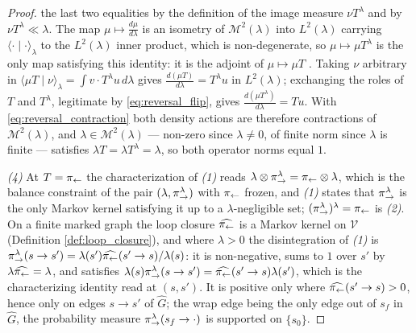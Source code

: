 \begin{proof}
the last two equalities by the definition of the image measure $\nu T^\lambda$ and by $\nu T^\lambda\ll\lambda$. The map $\mu\mapsto\frac{d\mu}{d\lambda}$ is an isometry of $\mathcal M^2(\lambda)$ into $L^2(\lambda)$ carrying $\langle\cdot\mid\cdot\rangle_\lambda$ to the $L^2(\lambda)$ inner product, which is non-degenerate, so $\mu\mapsto\mu T^\lambda$ is the only map satisfying this identity: it is the adjoint of $\mu\mapsto\mu T$ \cite{brezis2011functional}. Taking $\nu$ arbitrary in $\langle\mu T\mid\nu\rangle_\lambda=\int v\cdot T^\lambda u\,d\lambda$ gives $\frac{d(\mu T)}{d\lambda}=T^\lambda u$ in $L^2(\lambda)$; exchanging the roles of $T$ and $T^\lambda$, legitimate by \eqref{eq:reversal_flip}, gives $\frac{d(\mu T^\lambda)}{d\lambda}=Tu$. With \eqref{eq:reversal_contraction} both density actions are therefore contractions of $\mathcal M^2(\lambda)$, and $\lambda\in\mathcal M^2(\lambda)$ --- non-zero since $\lambda\neq0$, of finite norm since $\lambda$ is finite --- satisfies $\lambda T=\lambda T^\lambda=\lambda$, so both operator norms equal $1$.

\emph{(4)} At $T=\pi_{\leftarrow}$ the characterization of \emph{(1)} reads $\lambda\otimes\pi_{\rightarrow}^\lambda=\pi_{\leftarrow}\otimes\lambda$, which is the balance constraint of the pair $(\lambda,\pi_{\rightarrow}^\lambda)$ with $\pi_{\leftarrow}$ frozen, and \emph{(1)} states that $\pi_{\rightarrow}^\lambda$ is the only Markov kernel satisfying it up to a $\lambda$-negligible set; $(\pi_{\rightarrow}^\lambda)^\lambda=\pi_{\leftarrow}$ is \emph{(2)}. On a finite marked graph the loop closure $\widehat{\pi_{\leftarrow}}$ is a Markov kernel on $\mathcal V$ (Definition \ref{def:loop_closure}), and where $\lambda>0$ the disintegration of \emph{(1)} is $\pi_{\rightarrow}^\lambda(s\rightarrow s')=\lambda(s')\widehat{\pi_{\leftarrow}}(s'\rightarrow s)/\lambda(s)$: it is non-negative, sums to $1$ over $s'$ by $\lambda\widehat{\pi_{\leftarrow}}=\lambda$, and satisfies $\lambda(s)\pi_{\rightarrow}^\lambda(s\rightarrow s')=\widehat{\pi_{\leftarrow}}(s'\rightarrow s)\lambda(s')$, which is the characterizing identity read at $(s,s')$. It is positive only where $\widehat{\pi_{\leftarrow}}(s'\rightarrow s)>0$, hence only on edges $s\rightarrow s'$ of $\widehat G$; the wrap edge being the only edge out of $s_f$ in $\widehat G$, the probability measure $\pi_{\rightarrow}^\lambda(s_f\rightarrow\cdot)$ is supported on $\{s_0\}$.
\end{proof}

